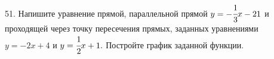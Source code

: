 51. Напишите уравнение прямой, параллельной прямой $y=-\cfrac{1}{3}x-21$  и проходящей через точку пересечения прямых, заданных уравнениями $y=-2x+4$ и $y=\cfrac{1}{2}x+1.$ Постройте график заданной функции.\\
